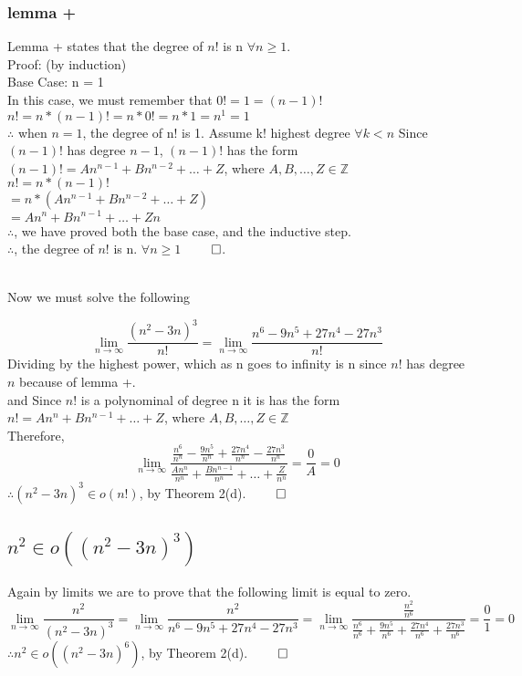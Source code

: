 \documentclass{article}
\begin{document}
        \subsubsection{lemma +}
          Lemma + states that the degree of $n!$ is n $\forall n \geq 1$. \\
          Proof: (by induction) \\
          Base Case: n = 1 \\
          In this case, we must remember that $0! = 1 = (n - 1)!$ \\
          $n! = n * (n - 1)! = n * 0! = n * 1 = n^{1} = 1$ \\
          $\therefore$ when $n = 1$, the degree of n! is 1.
          Assume k! highest degree $\forall k < n$
          Since $(n - 1)!$ has degree $n - 1$, $(n - 1)!$ has the form $(n - 1)! = An^{n - 1} + Bn^{n - 2} + \dots + Z$, where $A,B,\dots,Z \in \mathbb{Z}$ \\
          $n! = n * (n - 1)!$ \\
          $= n * (An^{n -1} + Bn^{n - 2} + \dots + Z)$ \\
          $= An^{n} + Bn^{n - 1} + \dots + Zn$ \\
          $\therefore$, we have proved both the base case, and the inductive step. \\
          $\therefore$, the degree of $n!$ is n. $\forall n \geq 1$  $\qed$. \\          
        \\
        \begin{center}Now we must solve the following\end{center}
          \[\lim_{n \to \infty} \frac{(n^{2} - 3n)^{3}}{n!} = \lim_{n \to \infty} \frac{n^{6} - 9n^{5} + 27n^{4} - 27n^{3}}{n!}\]
          Dividing by the highest power, which as n goes to infinity is n since $n!$ has degree $n$ because of lemma +. \\
          and Since $n!$ is a polynominal of degree n it is has the form $n! = An^{n} + Bn^{n-1} + \dots + Z$, where $A, B, \dots, Z \in \mathbb{Z}$ \\
        Therefore, \[\lim_{n \to \infty} \frac{\frac{n^{6}}{n^{n}} - \frac{9n^{5}}{n^{n}} + \frac{27n^{4}}{n^{n}} - \frac{27n^{3}}{n^{n}}}{\frac{An^{n}}{n^{n}} + \frac{Bn^{n-1}}{n^{n}} + \dots + \frac{Z}{n^{n}}} = \frac{0}{A} = 0\]
        $\therefore (n^{2} - 3n)^{3} \in o(n!)$, by Theorem 2(d). $\qed$
        \subsection{$n^{2} \in o((n^{2} - 3n)^{3})$}
          Again by limits we are to prove that the following limit is equal to zero.
          \[\lim_{n \to \infty} \frac{n^{2}}{(n^{2} - 3n)^{3}} = \lim_{n \to \infty} \frac{n^2}{n^{6} - 9n^{5} + 27n^{4} - 27n^{3}} = \lim_{n \to \infty}\frac{\frac{n^{2}}{n^{6}}}{\frac{n^{6}}{n^{6}} + \frac{9n^{5}}{n^{6}} + \frac{27n^{4}}{n^{6}} + \frac{27n^{3}}{n^{6}}} = \frac{0}{1} = 0\]
          $\therefore n^{2} \in o((n^{2} - 3n)^{6})$, by Theorem 2(d). $\qed$
\end{document}
